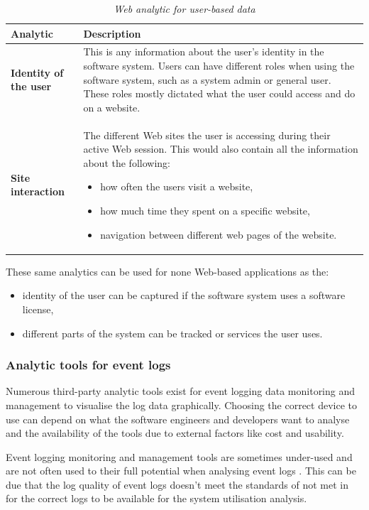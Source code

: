 \begin{table}[!htb]
	\centering
	\caption[Web analytic for user-based data]
	{\textit{Web analytic for user-based data}}
	\label{tbl:ch1_webAnalytics}
	\begin{tabularx}{\textwidth}{|l|X|}
		\hline \textbf{Analytic}  & \textbf{Description} \\
		\hline \textbf{Identity of the user} & This is any information about the user's identity in the software system. Users can have different roles when using the software system, such as a system admin or general user. These roles mostly dictated what the user could access and do on a website. \\
		\hline \textbf{Site interaction} & The different Web sites the user is accessing during their active Web session. This would also contain all the information about the following: 
		\begin{itemize}
			\item how often the users visit a website,
			\item how much time they spent on a specific website,
			\item navigation between different web pages of the website.
		\end{itemize}
		\\
		\hline
	\end{tabularx}
\end{table}

These same analytics can be used for none Web-based applications as the: 
\begin{itemize}
	\item identity of the user can be captured if the software system uses a software license,
	\item different parts of the system can be tracked or services the user uses.
\end{itemize} 

\subsubsection{Analytic tools for event logs}
Numerous third-party analytic tools exist for event logging data monitoring and management to visualise the log data graphically. Choosing the correct device to use can depend on what the software engineers and developers want to analyse and the availability of the tools due to external factors like cost and usability. \par Event logging monitoring and management tools are sometimes under-used and are not often used to their full potential when analysing event logs \cite{Fedaghi2010}. This can be due that the log quality of event logs doesn't meet the standards of  not met in  for the correct logs to be available for the system utilisation analysis. 

